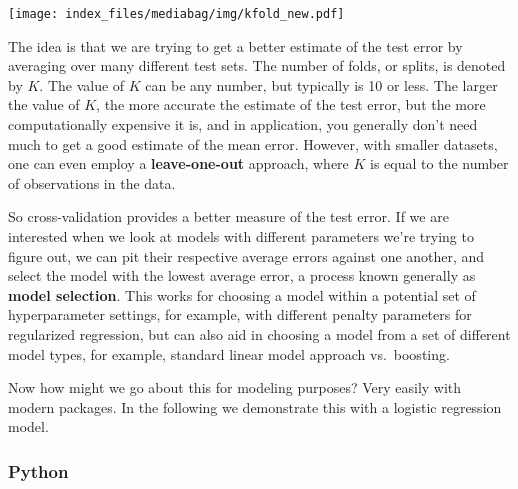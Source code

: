\documentclass[
  letterpaper,
]{krantz}
\newenvironment{Shaded}{}{}
\newcommand{\BuiltInTok}[1]{\textcolor[rgb]{0.00,0.50,0.00}{#1}}
\newcommand{\CommentTok}[1]{\textcolor[rgb]{0.38,0.63,0.69}{\textit{#1}}}
\newcommand{\DecValTok}[1]{\textcolor[rgb]{0.25,0.63,0.44}{#1}}
\newcommand{\ImportTok}[1]{\textcolor[rgb]{0.00,0.50,0.00}{\textbf{#1}}}
\newcommand{\NormalTok}[1]{#1}
\newcommand{\OperatorTok}[1]{\textcolor[rgb]{0.40,0.40,0.40}{#1}}
\newcommand{\StringTok}[1]{\textcolor[rgb]{0.25,0.44,0.63}{#1}}
\begin{document}
\texttt{[image: index\_files/mediabag/img/kfold\_new.pdf]}

The idea is that we are trying to get a better estimate of the test
error by averaging over many different test sets. The number of folds,
or splits, is denoted by \(K\). The value of \(K\) can be any number,
but typically is 10 or less. The larger the value of \(K\), the more
accurate the estimate of the test error, but the more computationally
expensive it is, and in application, you generally don't need much to
get a good estimate of the mean error. However, with smaller datasets,
one can even employ a \textbf{leave-one-out} approach, where \(K\) is
equal to the number of observations in the data.

So cross-validation provides a better measure of the test error. If we
are interested when we look at models with different parameters we're
trying to figure out, we can pit their respective average errors against
one another, and select the model with the lowest average error, a
process known generally as \textbf{model selection}. This works for
choosing a model within a potential set of hyperparameter settings, for
example, with different penalty parameters for regularized regression,
but can also aid in choosing a model from a set of different model
types, for example, standard linear model approach vs.~boosting.

Now how might we go about this for modeling purposes? Very easily with
modern packages. In the following we demonstrate this with a logistic
regression model.

\subsubsection{Python}

\begin{Shaded}
\end{Shaded}
\end{document}
